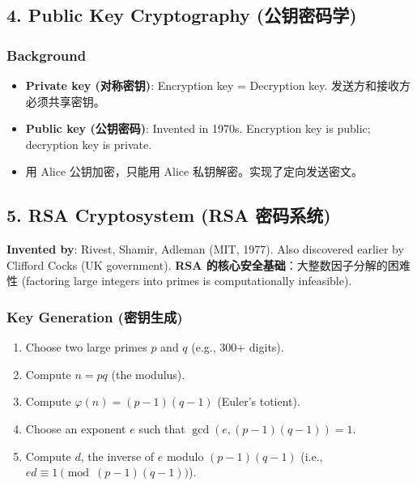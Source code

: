 \documentclass[10pt,a4paper,openany]{ctexbook}
\theoremstyle{definition}
\theoremstyle{remark}
\begin{document}
\subsection{4. Public Key Cryptography (公钥密码学)}

\subsubsection{Background}

\begin{itemize}
\item \textbf{Private key (对称密钥)}: Encryption key = Decryption key. 发送方和接收方必须共享密钥。
\item \textbf{Public key (公钥密码)}: Invented in 1970s. Encryption key is public; decryption key is private.
\item 用 Alice 公钥加密，只能用 Alice 私钥解密。实现了定向发送密文。

\end{itemize}

\vspace{-2pt}

\subsection{5. RSA Cryptosystem (RSA 密码系统)}

\textbf{Invented by}: Rivest, Shamir, Adleman (MIT, 1977). Also discovered earlier by Clifford Cocks (UK government).
\textbf{RSA 的核心安全基础}：大整数因子分解的困难性 (factoring large integers into primes is computationally infeasible).
\subsubsection{Key Generation (密钥生成)}

\begin{enumerate}
\item Choose two large primes $p$ and $q$ (e.g., 300+ digits).
\item Compute $n = pq$ (the modulus).
\item Compute $\varphi(n) = (p-1)(q-1)$ (Euler's totient).
\item Choose an exponent $e$ such that $\gcd(e, (p-1)(q-1)) = 1$.
\item Compute $d$, the inverse of $e$ modulo $(p-1)(q-1)$ (i.e., $ed \equiv 1 \pmod{(p-1)(q-1)}$).

\end{enumerate}
\end{document}
